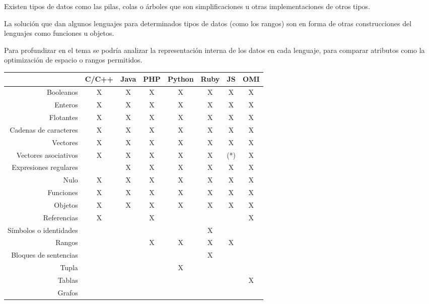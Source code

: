 Existen tipos de datos como las pilas, colas o árboles que son simplificaciones u otras 
implementaciones de otros tipos.

La solución que dan algunos lenguajes para determinados tipos de datos (como los rangos) son en forma 
de otras construcciones del lenguajes como funciones u objetos.

Para profundizar en el tema se podría analizar la representación interna de los
datos en cada lenguaje, para comparar atributos como la optimización de espacio o rangos permitidos. 

 \FloatBarrier
\begin{table}[h]
 \begin{center}
\begin{tabular}{|r|c|c|c|c|c|c|c|} \hline
 & C/C++ & Java & PHP  & Python & Ruby & JS & OMI \\ \hline
Booleanos & X & X & X & X & X & X & X \\ \hline
Enteros & X & X& X & X & X & X & X \\ \hline
Flotantes & X & X & X & X & X & X & X \\ \hline
Cadenas de caracteres & X & X & X & X & X & X & X \\ \hline
Vectores  & X & X & X & X & X & X & X \\ \hline
Vectores asociativos & X & X & X & X & X & (*) & X \\ \hline 
Expresiones regulares &  & X & X & X & X & X & X \\ \hline
Nulo & X & X & X & X & X & X & X \\ \hline
Funciones & X & X & X & X & X & X & X \\ \hline
Objetos & X & X & X & X & X & X & X \\ \hline
Referencias & X & & X & & & & X \\ \hline
Símbolos o identidades & & & & & X &  &  \\ \hline
Rangos  & & & X & X & X & X &  \\ \hline
Bloques de sentencias & & & & & X & &  \\ \hline 
Tupla  & & & & X & & &  \\ \hline
Tablas &  &  &  &  &  &  & X \\ \hline
Grafos &  &  &  &  &  &  &  \\ \hline
\end{tabular}

\end{center}
\end{table}
\FloatBarrier

